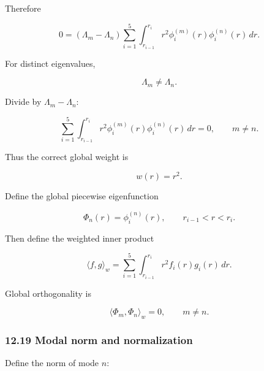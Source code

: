 \documentclass[11pt,a4paper]{article}
\begin{document}
Therefore

\begin{equation}
0
=
(\Lambda_m-\Lambda_n)
\sum_{i=1}^{5}
\int_{r_{i-1}}^{r_i}
r^2
\phi_i^{(m)}(r)
\phi_i^{(n)}(r)
\,dr.
\tag{TRISO-ML-526}
\label{eq:triso-ml-526}
\end{equation}

For distinct eigenvalues,

\begin{equation}
\Lambda_m\ne\Lambda_n.
\tag{TRISO-ML-527}
\label{eq:triso-ml-527}
\end{equation}

Divide by $\Lambda_m-\Lambda_n$:

\begin{equation}
\boxed{
\sum_{i=1}^{5}
\int_{r_{i-1}}^{r_i}
r^2
\phi_i^{(m)}(r)
\phi_i^{(n)}(r)
\,dr
=
0,
\qquad
m\ne n.
}
\tag{TRISO-ML-528}
\label{eq:triso-ml-528}
\end{equation}

Thus the correct global weight is

\begin{equation}
\boxed{
w(r)=r^2.
}
\tag{TRISO-ML-529}
\label{eq:triso-ml-529}
\end{equation}

Define the global piecewise eigenfunction

\begin{equation}
\Phi_n(r)
=
\phi_i^{(n)}(r),
\qquad
r_{i-1}<r<r_i.
\tag{TRISO-ML-530}
\label{eq:triso-ml-530}
\end{equation}

Then define the weighted inner product

\begin{equation}
\boxed{
\langle f,g\rangle_w
=
\sum_{i=1}^{5}
\int_{r_{i-1}}^{r_i}
r^2f_i(r)g_i(r)\,dr.
}
\tag{TRISO-ML-531}
\label{eq:triso-ml-531}
\end{equation}

Global orthogonality is

\begin{equation}
\boxed{
\langle\Phi_m,\Phi_n\rangle_w=0,
\qquad
m\ne n.
}
\tag{TRISO-ML-532}
\label{eq:triso-ml-532}
\end{equation}

\subsubsection*{12.19 Modal norm and normalization}

Define the norm of mode $n$:
\end{document}
